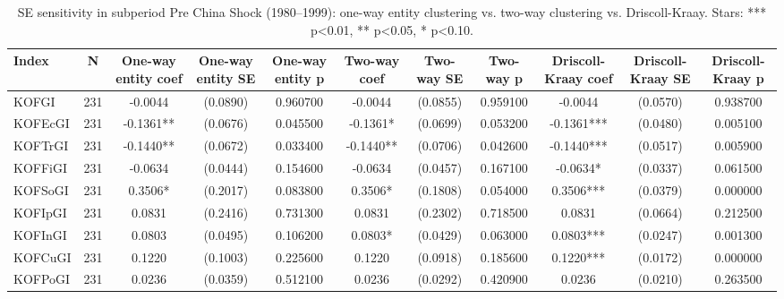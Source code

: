 \begin{table}[htbp]
\caption{SE sensitivity in subperiod Pre China Shock (1980--1999): one-way entity clustering vs. two-way clustering vs. Driscoll-Kraay. Stars: *** p<0.01, ** p<0.05, * p<0.10.}
\label{tab:se_comparison_pre_china_shock}
\begin{tabular}{lcccccccccc}
\toprule
Index & N & One-way entity coef & One-way entity SE & One-way entity p & Two-way coef & Two-way SE & Two-way p & Driscoll-Kraay coef & Driscoll-Kraay SE & Driscoll-Kraay p \\
\midrule
KOFGI & 231 & -0.0044 & (0.0890) & 0.960700 & -0.0044 & (0.0855) & 0.959100 & -0.0044 & (0.0570) & 0.938700 \\
KOFEcGI & 231 & -0.1361** & (0.0676) & 0.045500 & -0.1361* & (0.0699) & 0.053200 & -0.1361*** & (0.0480) & 0.005100 \\
KOFTrGI & 231 & -0.1440** & (0.0672) & 0.033400 & -0.1440** & (0.0706) & 0.042600 & -0.1440*** & (0.0517) & 0.005900 \\
KOFFiGI & 231 & -0.0634 & (0.0444) & 0.154600 & -0.0634 & (0.0457) & 0.167100 & -0.0634* & (0.0337) & 0.061500 \\
KOFSoGI & 231 & 0.3506* & (0.2017) & 0.083800 & 0.3506* & (0.1808) & 0.054000 & 0.3506*** & (0.0379) & 0.000000 \\
KOFIpGI & 231 & 0.0831 & (0.2416) & 0.731300 & 0.0831 & (0.2302) & 0.718500 & 0.0831 & (0.0664) & 0.212500 \\
KOFInGI & 231 & 0.0803 & (0.0495) & 0.106200 & 0.0803* & (0.0429) & 0.063000 & 0.0803*** & (0.0247) & 0.001300 \\
KOFCuGI & 231 & 0.1220 & (0.1003) & 0.225600 & 0.1220 & (0.0918) & 0.185600 & 0.1220*** & (0.0172) & 0.000000 \\
KOFPoGI & 231 & 0.0236 & (0.0359) & 0.512100 & 0.0236 & (0.0292) & 0.420900 & 0.0236 & (0.0210) & 0.263500 \\
\bottomrule
\end{tabular}
\end{table}
